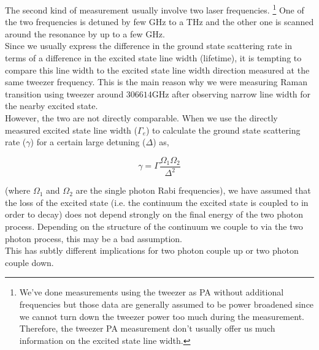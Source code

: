 \documentclass[10pt,fleqn]{article}
\begin{document}
The second kind of measurement usually involve two laser frequencies.
\footnote{We've done measurements using the tweezer as PA without additional frequencies but
  those data are generally assumed to be power broadened since we cannot turn down the
  tweezer power too much during the measurement. Therefore, the tweezer PA measurement
  don't usually offer us much information on the excited state line width.}
One of the two frequencies is detuned by few GHz to a THz and the other one is scanned
around the resonance by up to a few GHz.\\

Since we usually express the difference in the ground state scattering rate in terms of
a difference in the excited state line width (lifetime), it is tempting to compare this
line width to the excited state line width direction measured at the same tweezer
frequency. This is the main reason why we were measuring Raman transition using
tweezer around $306614 \mathrm{GHz}$ after observing narrow line width for the nearby
excited state.\\

However, the two are not directly comparable. When we use the directly measured
excited state line width ($\Gamma_e$) to calculate the ground state scattering rate ($\gamma$)
for a certain large detuning ($\Delta$) as,

\[ \gamma=\Gamma\frac{\Omega_1\Omega_2}{\Delta^2} \]

(where $\Omega_1$ and $\Omega_2$ are the single photon Rabi frequencies), we have
assumed that the loss of the excited state
(i.e. the continuum the excited state is coupled to in order to decay)
does not depend strongly on the final energy of the two photon process.
Depending on the structure of the continuum we couple to via the two photon process,
this may be a bad assumption.\\

This has subtly different implications for two photon couple up or two photon couple down.
\end{document}
